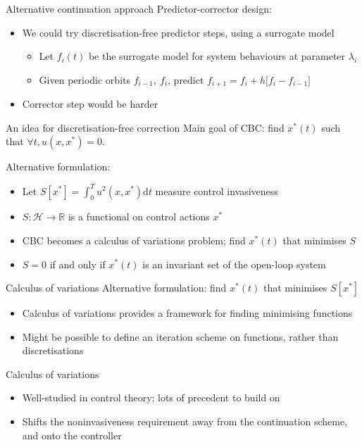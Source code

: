 \documentclass[presentation]{beamer}
\begin{document}
\begin{frame}[label={sec:orgb927845}]{Alternative continuation approach}
Predictor-corrector design:
\vfill
\begin{itemize}
\item We could try discretisation-free predictor steps, using a surrogate model
\begin{itemize}
\item Let \(f_i(t)\) be the surrogate model for system behaviours at parameter \(\lambda_i\)
\item Given periodic orbits \(f_{i-1},~f_i\), predict \(f_{i+1} = f_i + h \big[f_i - f_{i-1}\big]\)
\end{itemize}
\item Corrector step would be harder
\end{itemize}
\end{frame}

\begin{frame}[label={sec:orga1223d4}]{An idea for discretisation-free correction}
Main goal of CBC: find \(x^*(t)\) such that \(\forall t, u(x,x^*)=0\).

\vfill
Alternative formulation:
\begin{itemize}[<+->]
\item Let \(S[x^*] = \int_0^T u^2(x,x^*) \mathrm{d}t\) measure control invasiveness
\item \(S: \mathcal{H} \to \mathbb{R}\) is a functional on control actions \(x^*\)
\item CBC becomes a calculus of variations problem; find \(x^*(t)\) that minimises \(S\)
\item \(S=0\) if and only if \(x^*(t)\) is an invariant set of the open-loop system
\end{itemize}

\vfill
\end{frame}
\begin{frame}[label={sec:org540d2f5}]{Calculus of variations}
Alternative formulation: find \(x^*(t)\) that minimises \(S[x^*]\)

\vfill

\begin{itemize}
\item Calculus of variations provides a framework for finding minimising functions
\item Might be possible to define an iteration scheme on functions, rather than discretisations
\end{itemize}

\vfill
Calculus of variations
\begin{itemize}
\item Well-studied in control theory; lots of precedent to build on
\item Shifts the noninvasiveness requirement away from the continuation scheme, and onto the controller
\end{itemize}
\end{frame}
\end{document}
